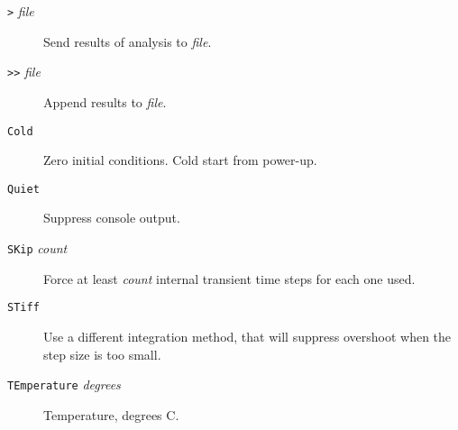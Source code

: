 \begin{description}


\item[{\tt >} {\it file}] Send results of analysis to {\it file}.

\item[{\tt >>} {\it file}] Append results to {\it file}.



\item[{\tt Cold}] Zero initial conditions.  Cold start from power-up.






\item[{\tt Quiet}] Suppress console output.

\item[{\tt SKip} {\it count}] Force at least {\it count} internal
transient time steps for each one used.

\item[{\tt STiff}] Use a different integration method,
that will suppress overshoot when the step size is too
small.

\item[{\tt TEmperature} {\it degrees}] Temperature,
degrees C.


\end{description}
